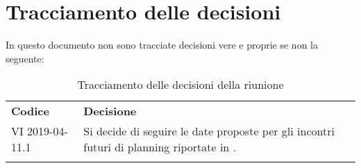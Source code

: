 \clearpage
\section{Tracciamento delle decisioni}
In questo documento non sono tracciate decisioni vere e proprie se non la seguente:
\begin{center}
	\renewcommand{\arraystretch}{1.5}
	\begin{longtable}{  p{2.8cm} p{11.4cm} }
		\rowcolor{tableHeadYellow}
		\textbf{Codice}&\textbf{Decisione}\\
		VI 2019-04-11.1 & Si decide di seguire le date proposte per gli incontri futuri di planning riportate in \addref{sec:sprint}.\\
		\rowcolor{white}
		\caption{Tracciamento delle decisioni della riunione}
	\end{longtable}	
\end{center}